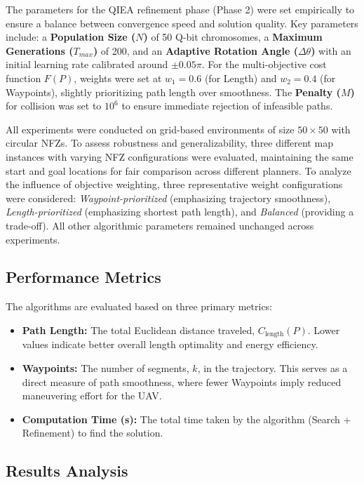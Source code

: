 The parameters for the QIEA refinement phase (Phase 2) were set empirically to ensure a balance between convergence speed and solution quality. Key parameters include: a \textbf{Population Size ($N$)} of 50 Q-bit chromosomes, a \textbf{Maximum Generations ($T_{max}$)} of 200, and an \textbf{Adaptive Rotation Angle ($\Delta \theta$)} with an initial learning rate calibrated around $\pm 0.05\pi$. For the multi-objective cost function $F(P)$, weights were set at $w_1=0.6$ (for Length) and $w_2=0.4$ (for Waypoints), slightly prioritizing path length over smoothness. The \textbf{Penalty ($M$)} for collision was set to $10^6$ to ensure immediate rejection of infeasible paths.

All experiments were conducted on grid-based environments of size $50 \times 50$ with circular NFZs. To assess robustness and generalizability, three different map instances with varying NFZ configurations were evaluated, maintaining the same start and goal locations for fair comparison across different planners. To analyze the influence of objective weighting, three representative weight configurations were considered: \textit{Waypoint-prioritized} (emphasizing trajectory smoothness), \textit{Length-prioritized} (emphasizing shortest path length), and \textit{Balanced} (providing a trade-off). All other algorithmic parameters remained unchanged across experiments.


\subsection{Performance Metrics}

The algorithms are evaluated based on three primary metrics:

\begin{itemize}
    \item \textbf{Path Length:} The total Euclidean distance traveled, $C_{\text{length}}(P)$. Lower values indicate better overall length optimality and energy efficiency.
    \item \textbf{Waypoints:} The number of segments, $k$, in the trajectory. This serves as a direct measure of path smoothness, where fewer Waypoints imply reduced maneuvering effort for the UAV.
    \item \textbf{Computation Time (s):} The total time taken by the algorithm (Search + Refinement) to find the solution.
\end{itemize}



\subsection{Results Analysis}

